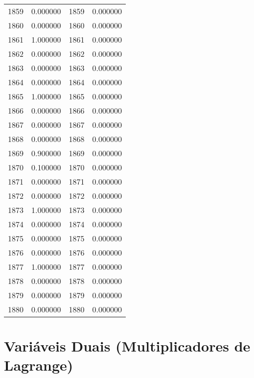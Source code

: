 \documentclass[12pt]{article}
\begin{document}
\begin{longtable}{@{}cccc@{}}
1859 & 0.000000 & 1859 & 0.000000 \\
1860 & 0.000000 & 1860 & 0.000000 \\
1861 & 1.000000 & 1861 & 0.000000 \\
1862 & 0.000000 & 1862 & 0.000000 \\
1863 & 0.000000 & 1863 & 0.000000 \\
1864 & 0.000000 & 1864 & 0.000000 \\
1865 & 1.000000 & 1865 & 0.000000 \\
1866 & 0.000000 & 1866 & 0.000000 \\
1867 & 0.000000 & 1867 & 0.000000 \\
1868 & 0.000000 & 1868 & 0.000000 \\
1869 & 0.900000 & 1869 & 0.000000 \\
1870 & 0.100000 & 1870 & 0.000000 \\
1871 & 0.000000 & 1871 & 0.000000 \\
1872 & 0.000000 & 1872 & 0.000000 \\
1873 & 1.000000 & 1873 & 0.000000 \\
1874 & 0.000000 & 1874 & 0.000000 \\
1875 & 0.000000 & 1875 & 0.000000 \\
1876 & 0.000000 & 1876 & 0.000000 \\
1877 & 1.000000 & 1877 & 0.000000 \\
1878 & 0.000000 & 1878 & 0.000000 \\
1879 & 0.000000 & 1879 & 0.000000 \\
1880 & 0.000000 & 1880 & 0.000000 \\

\end{longtable}

\section{Variáveis Duais (Multiplicadores de Lagrange)}
\end{document}
